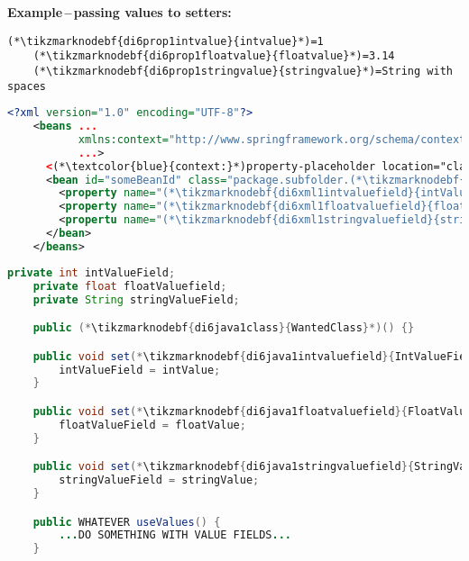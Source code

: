 \noindent \textbf{Example\,--\,passing values to setters:}
\begin{lstlisting}[title={A \textit{.properties} file called \tikzmarknodebf{di6prop1filename}{\textit{setters.properties}}}]
    (*\tikzmarknodebf{di6prop1intvalue}{intvalue}*)=1
    (*\tikzmarknodebf{di6prop1floatvalue}{floatvalue}*)=3.14
    (*\tikzmarknodebf{di6prop1stringvalue}{stringvalue}*)=String with spaces
\end{lstlisting}
\begin{lstlisting}[language=XML, title={Configuration XML}]
    <?xml version="1.0" encoding="UTF-8"?>
    <beans ...
           xmlns:context="http://www.springframework.org/schema/context"
           ...>
      <(*\textcolor{blue}{context:}*)property-placeholder location="classpath:(*\tikzmarknodebf{di6xml1filename}{setter.properties}[ForestGreen]*)"/>
      <bean id="someBeanId" class="package.subfolder.(*\tikzmarknodebf{di6xml1class}{WantedClass}[ForestGreen]*)">
        <property name="(*\tikzmarknodebf{di6xml1intvaluefield}{intValueField}[ForestGreen]*)" value="(*\textcolor{ForestGreen}{\$\{}\tikzmarknodebf{di6xml1intvalue}{intvalue}[ForestGreen]\textcolor{ForestGreen}{\}}*)"/>
        <property name="(*\tikzmarknodebf{di6xml1floatvaluefield}{floatValueField}[ForestGreen]*)" value="(*\textcolor{ForestGreen}{\$\{}\tikzmarknodebf{di6xml1floatvalue}{floatvalue}[ForestGreen]\textcolor{ForestGreen}{\}}*)"/>
        <propertu name="(*\tikzmarknodebf{di6xml1stringvaluefield}{stringValueField}[ForestGreen]*)" value="(*\textcolor{ForestGreen}{\$\{}\tikzmarknodebf{di6xml1stringvalue}{stringvalue}[ForestGreen]\textcolor{ForestGreen}{\}}*)"/>
      </bean>
    </beans>
\end{lstlisting}
\begin{lstlisting}[language=Java, title={Wanted class with the zero--parameter constructor and setter methods}]
    private int intValueField;
    private float floatValuefield;
    private String stringValueField;

    public (*\tikzmarknodebf{di6java1class}{WantedClass}*)() {}

    public void set(*\tikzmarknodebf{di6java1intvaluefield}{IntValueField}*)(int intValue) {
        intValueField = intValue;
    }

    public void set(*\tikzmarknodebf{di6java1floatvaluefield}{FloatValueField}*)(float floatValue) {
        floatValueField = floatValue;
    }

    public void set(*\tikzmarknodebf{di6java1stringvaluefield}{StringValueField}*)(string stringValue) {
        stringValueField = stringValue;
    }

    public WHATEVER useValues() {
        ...DO SOMETHING WITH VALUE FIELDS...
    }
\end{lstlisting}
